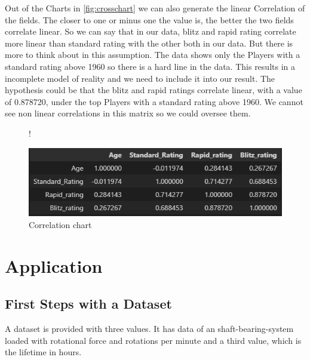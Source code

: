 \documentclass[a4paper, 12pt, oneside]{scrbook}
\begin{document}
			\noindent Out of the Charts in \ref{fig:crosschart} we can also generate the linear Correlation of the fields. The closer to one or minus one the value is, the better the two fields correlate linear. So we can say that in our data, blitz and rapid rating correlate more linear than standard rating with the other both in our data. But there is more to think about in this assumption. The data shows only the Players with a standard rating above 1960 so there is a hard line in the data. This results in a incomplete model of reality and we need to include it into our result. 
			The hypothesis could be that the blitz and rapid ratings correlate linear, with a value of 0.878720, under the top Players with a standard rating above 1960.
			We cannot see non linear correlations in this matrix so we could oversee them.
			
			\begin{figure} [H]
				\centering
				\resizebox{\linewidth} {!} {
					\includegraphics{res/Correlation.png}
					
				}
				\caption{Correlation chart}
				\label{fig:correlation}
			\end{figure}
			
	\chapter{Application}
		\section{First Steps with a Dataset}
			\noindent A dataset is provided with three values. It has data of an shaft-bearing-system loaded with rotational force and rotations per minute and a third value, which is the lifetime in hours.
			
\end{document}
